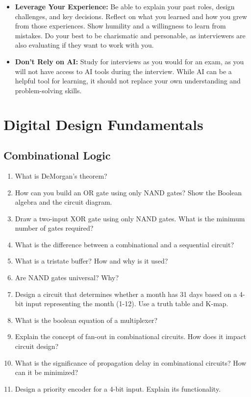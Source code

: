 \documentclass[11pt]{article}
\begin{document}
\begin{itemize}
    \item \textbf{Leverage Your Experience:} Be able to explain your past
    roles, design challenges, and key decisions. Reflect on what you learned
    and how you grew from those experiences. Show humility and a willingness to
    learn from mistakes. Do your best to be charismatic and personable, as
    interviewers are also evaluating if they want to work with you.

    \item \textbf{Don't Rely on AI:} Study for interviews as you would for an
    exam, as you will not have access to AI tools during the interview. While
    AI can be a helpful tool for learning, it should not replace your own
    understanding and problem-solving skills.
\end{itemize}

\section{Digital Design Fundamentals}

\subsection{Combinational Logic}
\begin{enumerate}
    \item What is DeMorgan's theorem?
    \item How can you build an OR gate using only NAND gates? Show the Boolean
    algebra and the circuit diagram.
    \item Draw a two-input XOR gate using only NAND gates. What is the minimum
    number of gates required?
    \item What is the difference between a combinational and a sequential
    circuit?
    \item What is a tristate buffer? How and why is it used?
    \item Are NAND gates universal? Why?
    \item Design a circuit that determines whether a month has 31 days based on
    a 4-bit input representing the month (1-12). Use a truth table and K-map.
    \item What is the boolean equation of a multiplexer?
    \item Explain the concept of fan-out in combinational circuits. How does it
    impact circuit design?
    \item What is the significance of propagation delay in combinational
    circuits? How can it be minimized?
    \item Design a priority encoder for a 4-bit input. Explain its
    functionality.
\end{enumerate}
\end{document}
